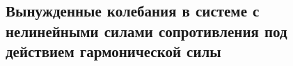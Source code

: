 

\subsection{Вынужденные колебания в системе с нелинейными силами сопротивления под действием гармонической силы}



